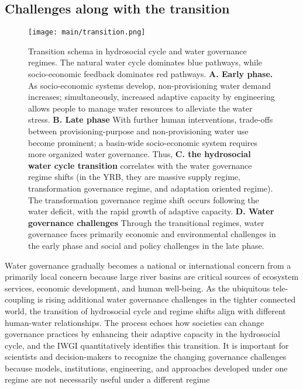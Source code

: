 \subsection{Challenges along with the transition}

\begin{figure*}[htbp!]
	\centering
	\texttt{[image: main/transition.png]}
	\caption{
		Transition schema in hydrosocial cycle and water governance regimes. The natural water cycle dominates blue pathways, while socio-economic feedback dominates red pathways.
		\textbf{A. Early phase.} As socio-economic systems develop, non-provisioning water demand increases; simultaneously, increased adaptive capacity by engineering allows people to manage water resources to alleviate the water stress.
		\textbf{B. Late phase} With further human interventions, trade-offs between provisioning-purpose and non-provisioning water use become prominent; a basin-wide socio-economic system requires more organized water governance.
		Thus, \textbf{C. the hydrosocial water cycle transition} correlates with the water governance regime shifts (in the YRB, they are massive supply regime, transformation governance regime, and adaptation oriented regime). The transformation governance regime shift occurs following the water deficit, with the rapid growth of adaptive capacity.
		\textbf{D. Water governance challenges} Through the transitional regimes, water governance faces primarily economic and environmental challenges in the early phase and social and policy challenges in the late phase.
	}
	\label{fig:summary}
\end{figure*}

Water governance gradually becomes a national or international concern from a primarily local concern because large river basins are critical sources of ecosystem services, economic development, and human well-being.
As the ubiquitous tele-coupling is rising additional water governance challenges in the tighter connected world, the transition of hydrosocial cycle and regime shifts align with different human-water relationships.
The process echoes how societies can change governance practices by enhancing their adaptive capacity in the hydrosocial cycle, and the IWGI quantitatively identifies this transition.
It is important for scientists and decision-makers to recognize the changing governance challenges because models, institutions, engineering, and approaches developed under one regime are not necessarily useful under a different regime


